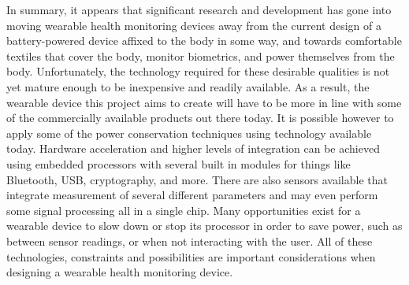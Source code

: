 In summary, it appears that significant research and development has gone into
moving wearable health monitoring devices away from the current design of a
battery-powered device affixed to the body in some way, and towards comfortable
textiles that cover the body, monitor biometrics, and power themselves from the
body.  Unfortunately, the technology required for these desirable qualities is 
not yet mature enough to be inexpensive and readily available.  As a result,
the wearable device this project aims to create will have to be more in line 
with some of the commercially available products out there today. It is
possible however to apply some of the power conservation techniques using 
technology available today. Hardware acceleration and higher levels of 
integration can be achieved using embedded processors with several built in
modules for things like Bluetooth, USB, cryptography, and more. There are also
sensors available that integrate measurement of several different parameters 
and may even perform some signal processing all in a single chip. Many 
opportunities exist for a wearable device to slow down or stop its processor in
order to save power, such as between sensor readings, or when not interacting
with the user. All of these technologies, constraints and possibilities are 
important considerations when designing a wearable health monitoring device.
